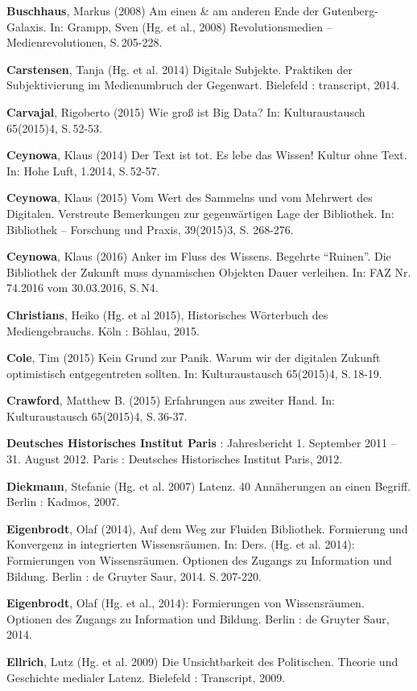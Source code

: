 \documentclass[a4paper,
fontsize=11pt,
oneside,
numbers=noperiodatend,
parskip=half-,
bibliography=totoc,
final
]{scrartcl}
\begin{document}
\textbf{Buschhaus}, Markus (2008) Am einen \& am anderen Ende der
Gutenberg-Galaxis. In: Grampp, Sven (Hg. et al., 2008) Revolutionsmedien
-- Medienrevolutionen, S.\,205-228.

\textbf{Carstensen}, Tanja (Hg. et al. 2014) Digitale Subjekte.
Praktiken der Subjektivierung im Medienumbruch der Gegenwart. Bielefeld
: transcript, 2014.

\textbf{Carvajal}, Rigoberto (2015) Wie groß ist Big Data? In:
Kulturaustausch 65(2015)4, S.\,52-53.

\textbf{Ceynowa}, Klaus (2014) Der Text ist tot. Es lebe das Wissen!
Kultur ohne Text. In: Hohe Luft, 1.2014, S.\,52-57.

\textbf{Ceynowa}, Klaus (2015) Vom Wert des Sammelns und vom Mehrwert
des Digitalen. Verstreute Bemerkungen zur gegenwärtigen Lage der
Bibliothek. In: Bibliothek -- Forschung und Praxis, 39(2015)3, S.
268-276.

\textbf{Ceynowa}, Klaus (2016) Anker im Fluss des Wissens. Begehrte
\enquote{Ruinen}. Die Bibliothek der Zukunft muss dynamischen Objekten
Dauer verleihen. In: FAZ Nr. 74.2016 vom 30.03.2016, S.\,N4.

\textbf{Christians}, Heiko (Hg. et al 2015), Historisches Wörterbuch des
Mediengebrauchs. Köln : Böhlau, 2015.

\textbf{Cole}, Tim (2015) Kein Grund zur Panik. Warum wir der digitalen
Zukunft optimistisch entgegentreten sollten. In: Kulturaustausch
65(2015)4, S.\,18-19.

\textbf{Crawford}, Matthew B. (2015) Erfahrungen aus zweiter Hand. In:
Kulturaustausch 65(2015)4, S.\,36-37.

\textbf{Deutsches Historisches Institut Paris} : Jahresbericht 1.
September 2011 -- 31. August 2012. Paris : Deutsches Historisches
Institut Paris, 2012.

\textbf{Diekmann}, Stefanie (Hg. et al. 2007) Latenz. 40 Annäherungen an
einen Begriff. Berlin : Kadmos, 2007.

\textbf{Eigenbrodt}, Olaf (2014), Auf dem Weg zur Fluiden Bibliothek.
Formierung und Konvergenz in integrierten Wissensräumen. In: Ders. (Hg.
et al. 2014): Formierungen von Wissensräumen. Optionen des Zugangs zu
Information und Bildung. Berlin : de Gruyter Saur, 2014. S.\,207-220.

\textbf{Eigenbrodt}, Olaf (Hg. et al., 2014): Formierungen von
Wissensräumen. Optionen des Zugangs zu Information und Bildung. Berlin :
de Gruyter Saur, 2014.

\textbf{Ellrich}, Lutz (Hg. et al. 2009) Die Unsichtbarkeit des
Politischen. Theorie und Geschichte medialer Latenz. Bielefeld :
Transcript, 2009.
\end{document}
